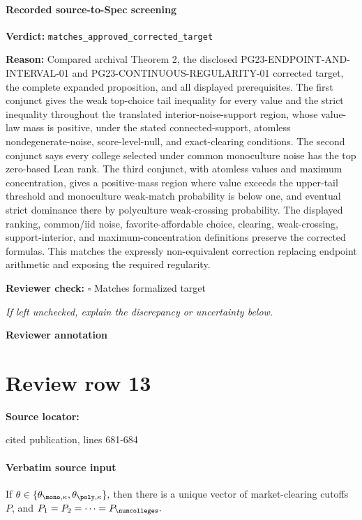 \documentclass[10pt]{article}
\newcommand{\reviewerbox}{%
  \par\noindent\fbox{\parbox{0.96\linewidth}{\rule{0pt}{0.38in}}}\par
}
\newcommand{\reviewmatch}[1]{%
  \par\noindent\textbf{Reviewer check:} $\square$\; #1\par
  \noindent\emph{If left unchecked, explain the discrepancy or uncertainty below.}\par
}
\begin{document}
\paragraph{Recorded source-to-Spec screening}
\textbf{Verdict:} \texttt{matches\_approved\_corrected\_target}
\\
{\raggedright
\textbf{Reason:} Compared archival Theorem 2, the disclosed PG23-\allowbreak{}ENDPOINT-\allowbreak{}AND-\allowbreak{}INTERVAL-\allowbreak{}01 and PG23-\allowbreak{}CONTINUOUS-\allowbreak{}REGULARITY-\allowbreak{}01 corrected target, the complete expanded proposition, and all displayed prerequisites.\allowbreak{} The first conjunct gives the weak top-\allowbreak{}choice tail inequality for every value and the strict inequality throughout the translated interior-\allowbreak{}noise-\allowbreak{}support region, whose value-\allowbreak{}law mass is positive, under the stated connected-\allowbreak{}support, atomless nondegenerate-\allowbreak{}noise, score-\allowbreak{}level-\allowbreak{}null, and exact-\allowbreak{}clearing conditions.\allowbreak{} The second conjunct says every college selected under common monoculture noise has the top zero-\allowbreak{}based Lean rank.\allowbreak{} The third conjunct, with atomless values and maximum concentration, gives a positive-\allowbreak{}mass region where value exceeds the upper-\allowbreak{}tail threshold and monoculture weak-\allowbreak{}match probability is below one, and eventual strict dominance there by polyculture weak-\allowbreak{}crossing probability.\allowbreak{} The displayed ranking, common/\allowbreak{}iid noise, favorite-\allowbreak{}affordable choice, clearing, weak-\allowbreak{}crossing, support-\allowbreak{}interior, and maximum-\allowbreak{}concentration definitions preserve the corrected formulas.\allowbreak{} This matches the expressly non-\allowbreak{}equivalent correction replacing endpoint arithmetic and exposing the required regularity.\allowbreak{}
\par}
\reviewmatch{Matches formalized target}
\noindent\textbf{Reviewer annotation}\par
\reviewerbox
\clearpage
\hypertarget{source-claim-5c1bf16c003e5b93}{}
\section*{Review row 13}
\textbf{Source locator:} {\footnotesize\raggedright cited publication, lines 681-\allowbreak{}684\par}
\paragraph{Verbatim source input}
\begin{ReviewVerbatim}
\begin{lemma}\label{lem:equal-cutoffs-diff-access}
    If $\theta\in \{\theta_{\mono, \kappa}, \theta_{\poly, \kappa}\},$ then there is a unique vector of market-clearing cutoffs $P$, and
    $P_1 = P_2 = \cdots = P_\numcolleges.$
\end{lemma}
\end{ReviewVerbatim}
\end{document}
